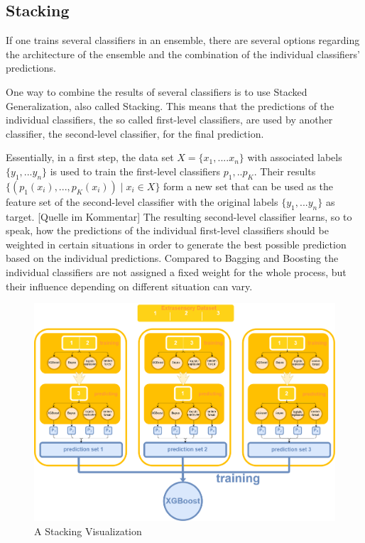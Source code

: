 \subsection{Stacking}

If one trains several classifiers in an ensemble, there are several options regarding the architecture of the ensemble and the combination of the individual classifiers' predictions.

One way to combine the results of several classifiers is to use Stacked Generalization, also called Stacking. This means that the predictions of the individual classifiers, the so called first-level classifiers, are used by another classifier, the second-level classifier, for the final prediction. 

Essentially, in a first step, the data set $X = \{x_1, ... .x_n\}$ with associated labels $\{y_1, ... y_n\}$ is used to train the first-level classifiers $p_1, .. p_K$. Their results $\{(p_1(x_i), ... , p_K(x_i)) \mid x_i \in X\}$ form a new set that can be used as the feature set of the second-level classifier with the original labels $\{y_1, ... y_n\}$ as target. [Quelle im Kommentar] %
The resulting second-level classifier learns, so to speak, how the predictions of the individual first-level classifiers should be weighted in certain situations in order to generate the best possible prediction based on the individual predictions. 
Compared to Bagging and Boosting the individual classifiers are not assigned a fixed weight for the whole process, but their influence depending on different situation can vary.
 

\begin{figure}[H]
	\begin{center}
		\includegraphics[width=\textwidth]{images/stacking_diagram.png}
		\caption{A Stacking Visualization}
		\label{abb:stacking}
	\end{center}		
\end{figure}	

